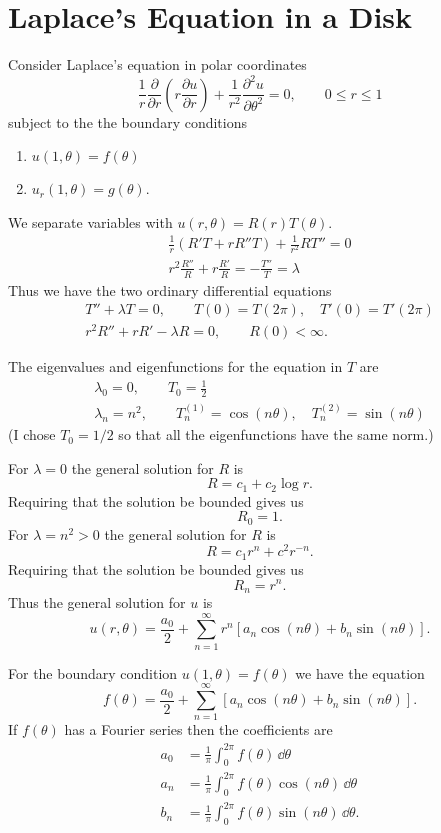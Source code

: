 \section{Laplace's Equation in a Disk}
Consider Laplace's equation in polar coordinates
\[ \frac{1}{r}\frac{\partial}{\partial r} \left(r\frac{\partial u}{\partial r}\right) + \frac{1}{r^2}
\frac{\partial^2u}{\partial \theta^2} = 0, \qquad 0 \leq r \leq 1 \]
subject to the the boundary conditions
\begin{enumerate}
\item $u(1,\theta) = f(\theta)$
\item $u_r(1,\theta) = g(\theta)$.
\end{enumerate}


We separate variables with $u(r,\theta) = R(r)T(\theta)$.
\begin{gather*}
  \frac{1}{r}(R' T + r R'' T) + \frac{1}{r^2} R T'' = 0 \\
  r^2\frac{R''}{R} + r \frac{R'}{R} = -\frac{T''}{T} = \lambda
\end{gather*}
Thus we have the two ordinary differential equations
\begin{gather*}
  T''+\lambda T = 0, \qquad T(0)=T(2\pi), \quad T'(0)=T'(2\pi) \\
  r^2 R'' + r R' - \lambda R = 0, \qquad R(0) < \infty.
\end{gather*}

The eigenvalues and eigenfunctions for the equation in $T$ are
\begin{gather*}
  \lambda_0 = 0, \qquad T_0 = \frac{1}{2} \\
  \lambda_n = n^2, \qquad T_n^{(1)} = \cos(n\theta), \quad
  T_n^{(2)} = \sin(n\theta)
\end{gather*}
(I chose $T_0=1/2$ so that all the eigenfunctions have the same norm.)

For $\lambda=0$ the general solution for $R$ is
\[ R = c_1 + c_2 \log r. \]
Requiring that the solution be bounded gives us
\[ R_0 = 1. \]
For $\lambda=n^2>0$ the general solution for $R$ is
\[ R = c_1 r^n + c^2 r^{-n}. \]
Requiring that the solution be bounded gives us
\[ R_n = r^n. \]
Thus the general solution for $u$ is
\[ \boxed{ u(r,\theta) = \frac{a_0}{2} + \sum_{n = 1}^\infty r^n \left[ a_n \cos(n\theta)
    + b_n \sin(n\theta) \right]. } \]

For the boundary condition $u(1,\theta)=f(\theta)$ we have the equation
\[ f(\theta) = \frac{a_0}{2} + \sum_{n = 1}^\infty  \left[ a_n \cos(n\theta)
  + b_n \sin(n\theta) \right]. \]
If $f(\theta)$ has a Fourier series then the coefficients are
\begin{align*}
  a_0 &= \frac{1}{\pi} \int_0^{2\pi} f(\theta)\,\dd \theta \\
  a_n &= \frac{1}{\pi} \int_0^{2\pi} f(\theta) \cos(n\theta)\,\dd \theta \\
  b_n &= \frac{1}{\pi} \int_0^{2\pi} f(\theta) \sin(n\theta)\,\dd \theta .
\end{align*}


